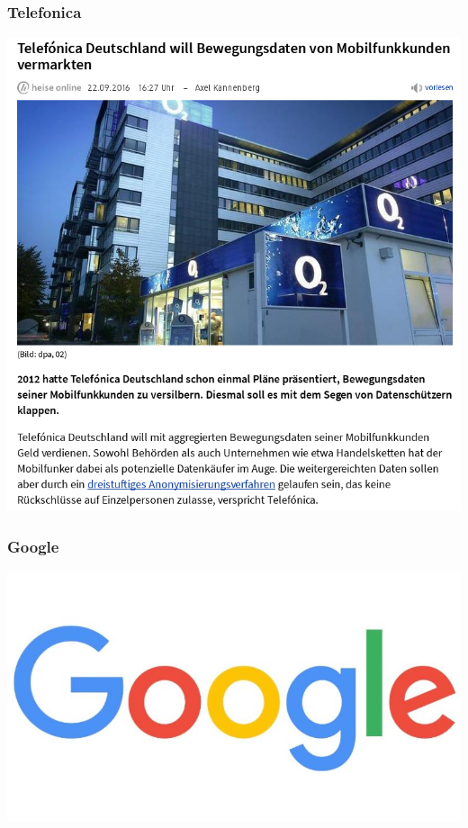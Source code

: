 \documentclass[12pt]{beamer}
\begin{document}
\begin{frame}
  \frametitle{Telefonica}
  \pause
  \begin{center}
    \includegraphics[height=0.7\textheight]{img/telefonica.png}
  \end{center}
\end{frame}

\begin{frame}
  \frametitle{Google}
  \begin{center}
    \includegraphics[height=0.4\textheight]{img/google.jpg}
  \end{center}
\end{frame}
\end{document}
